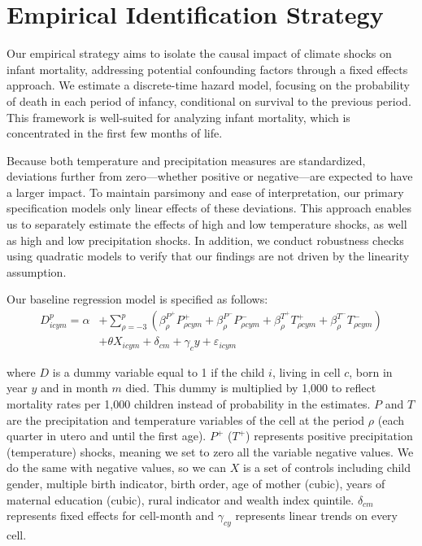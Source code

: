 \documentclass[a4paper]{article}
\begin{document}
\section{Empirical Identification Strategy}
Our empirical strategy aims to isolate the causal impact of climate shocks on infant mortality, addressing potential confounding factors through a fixed effects approach. We estimate a discrete-time hazard model, focusing on the probability of death in each period of infancy, conditional on survival to the previous period.  This framework is well-suited for analyzing infant mortality, which is concentrated in the first few months of life.

Because both temperature and precipitation measures are standardized, deviations further from zero—whether positive or negative—are expected to have a larger impact. To maintain parsimony and ease of interpretation, our primary specification models only linear effects of these deviations. This approach enables us to separately estimate the effects of high and low temperature shocks, as well as high and low precipitation shocks. In addition, we conduct robustness checks using quadratic models to verify that our findings are not driven by the linearity assumption.

Our baseline regression model is specified as follows:
\begin{equation}
\begin{split}
  D_{icym}^p = \alpha &+ \sum_{\rho = -3}^{p} \left( \beta^{P^+}_{\rho} P^+_{\rho cym} + \beta^{P^-}_{\rho} P^-_{\rho cym} + \beta^{T^+}_{\rho} T^+_{\rho cym} + \beta^{T^-}_{\rho} T^-_{\rho cym} \right) \\
  &+ \theta X_{icym} + \delta_{cm} + \gamma_{c}y + \varepsilon_{icym}
\end{split}
  \label{originalmodel}
\end{equation}


where $D$ is a dummy variable equal to 1 if the child $i$, living in cell $c$, born in year $y$ and in month $m$ died. This dummy is multiplied by 1,000 to reflect mortality rates per 1,000 children instead of probability in the estimates. $P$ and $T$ are the precipitation and temperature variables of the cell at the period $\rho$ (each quarter in utero and until the first age). $P^+$ ($T^+$) represents positive precipitation (temperature) shocks, meaning we set to zero all the variable negative values. We do the same with negative values, so we can  $X$ is a set of controls including child gender, multiple birth indicator, birth order, age of mother (cubic), years of maternal education (cubic), rural indicator and wealth index quintile. $\delta_{cm}$ represents fixed effects for cell-month and $\gamma_{cy}$ represents linear trends on every cell.
\end{document}
